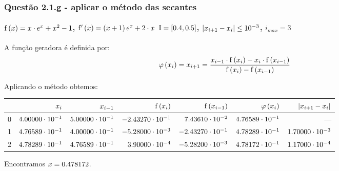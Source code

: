 \begin{frame}
\frametitle{Questão 2.1.g - aplicar o método das secantes}
\framesubtitle{$\mathrm{f}\left(x\right) = x \cdot e^x + x^2 - 1$,
$\mathrm{f}'\left(x\right) = \left(x + 1\right)e^x + 2 \cdot x$ 
$\mathrm{I} = [0.4,0.5]$, $|x_{i+1} - x_i| \leq 10^{-3}$, $i_{max} = 3$}

A função geradora é definida por: 
\[
\varphi\left(x_i\right) = x_{i+1} = 
\frac
  {x_{i-1} \cdot \mathrm{f}\left(x_i\right) - x_i \cdot \mathrm{f} \left(x_{i-1}\right)}
  {\mathrm{f}\left(x_i\right) - \mathrm{f}\left(x_{i-1}\right)}
\]

Aplicando o método obtemos:\\
{\tiny
\begin{center}
\begin{tabular}{r|r|r|r|r|r|r}
  &
  $x_i$ &
  $x_{i-1} $ &
  $\mathrm{f}\left(x_i\right) $ &
  $\mathrm{f}\left(x_{i-1}\right) $ &
  $\varphi\left(x_i\right) $ &
  $|x_{i+1} - x_i|$ \\
\hline
\hline
  0 &
  $4.00000 \cdot 10^{-1}$ &
  $5.00000 \cdot 10^{-1}$ &
  $-2.43270 \cdot 10^{-1}$ &
  $7.43610 \cdot 10^{-2}$ &
  $4.76589 \cdot 10^{-1}$ &
  ---
  \\
\hline
  1 &
  $4.76589 \cdot 10^{-1}$ &
  $4.00000 \cdot 10^{-1}$ &
  $-5.28000 \cdot 10^{-3}$ &
  $-2.43270 \cdot 10^{-1}$ &
  $4.78289 \cdot 10^{-1}$ &
  $1.70000 \cdot 10^{-3}$
  \\
\hline
  2 &
  $4.78289 \cdot 10^{-1}$ &
  $4.76589 \cdot 10^{-1}$ &
  $3.90000 \cdot 10^{-4}$ &
  $-5.28200 \cdot 10^{-3}$ &
  $4.78172 \cdot 10^{-1}$ &
  $1.17000 \cdot 10^{-4}$
  \\
\hline
\end{tabular}
\end{center}
}

Encontramos $x = 0.478172$.
\end{frame}

